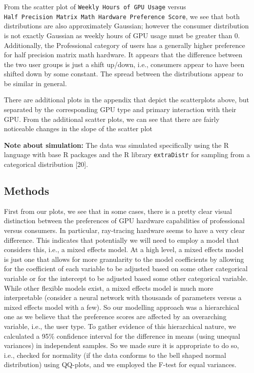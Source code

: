 \documentclass[
]{article}
\begin{document}
From the scatter plot of \texttt{Weekly\ Hours\ of\ GPU\ Usage} versus
\texttt{Half\ Precision\ Matrix\ Math\ Hardware\ Preference\ Score}, we
see that both distributions are also approximately Gaussian; however the
consumer distribution is not exactly Gaussian as weekly hours of GPU
usage must be greater than 0. Additionally, the Professional category of
users has a generally higher preference for half precision matrix math
hardware. It appears that the difference between the two user groups is
just a shift up/down, i.e., consumers appear to have been shifted down
by some constant. The spread between the distributions appear to be
similar in general.

There are additional plots in the appendix that depict the scatterplots
above, but separated by the corresponding GPU type and primary
interaction with their GPU. From the additional scatter plots, we can
see that there are fairly noticeable changes in the slope of the scatter
plot

\textbf{Note about simulation:} The data was simulated specifically
using the R language with base R packages and the R library
\texttt{extraDistr} for sampling from a categorical distribution
{[}20{]}.

\hypertarget{methods}{%
\subsection{Methods}\label{methods}}

First from our plots, we see that in some cases, there is a pretty clear
visual distinction between the preferences of GPU hardware capabilities
of professional versus consumers. In particular, ray-tracing hardware
seems to have a very clear difference. This indicates that potentially
we will need to employ a model that considers this, i.e., a mixed
effects model. At a high level, a mixed effects model is just one that
allows for more granularity to the model coefficients by allowing for
the coefficient of each variable to be adjusted based on some other
categorical variable or for the intercept to be adjusted based some
other categorical variable. While other flexible models exist, a mixed
effects model is much more interpretable (consider a neural network with
thousands of parameters versus a mixed effects model with a few). So our
modelling approach was a hierarchical one as we believe that the
preference scores are affected by an overarching variable, i.e., the
user type. To gather evidence of this hierarchical nature, we calculated
a 95\% confidence interval for the difference in means (using unequal
variances) in independent samples. So we made sure it is appropriate to
do so, i.e., checked for normality (if the data conforms to the bell
shaped normal distribution) using QQ-plots, and we employed the F-test
for equal variances.
\end{document}
